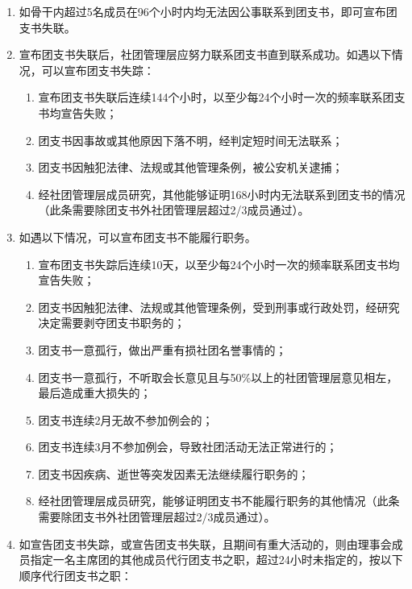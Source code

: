 \begin{enumerate}[resume]
    \item 如骨干内超过5名成员在96个小时内均无法因公事联系到团支书，即可宣布团支书失联。
    
    \item 宣布团支书失联后，社团管理层应努力联系团支书直到联系成功。如遇以下情况，可以宣布团支书失踪：
    
    \begin{enumerate}
        \item 宣布团支书失联后连续144个小时，以至少每24个小时一次的频率联系团支书均宣告失败；
        \item 团支书因事故或其他原因下落不明，经判定短时间无法联系；
        \item 团支书因触犯法律、法规或其他管理条例，被公安机关逮捕；
        \item 经社团管理层成员研究，其他能够证明168小时内无法联系到团支书的情况（此条需要除团支书外社团管理层超过2/3成员通过）。
    \end{enumerate}

    \item 如遇以下情况，可以宣布团支书不能履行职务。
    
    \begin{enumerate}
        \item 宣布团支书失踪后连续10天，以至少每24个小时一次的频率联系团支书均宣告失败；
        \item 团支书因触犯法律、法规或其他管理条例，受到刑事或行政处罚，经研究决定需要剥夺团支书职务的；
        \item 团支书一意孤行，做出严重有损社团名誉事情的；
        \item 团支书一意孤行，不听取会长意见且与50\%以上的社团管理层意见相左，最后造成重大损失的；
        \item 团支书连续2月无故不参加例会的；
        \item 团支书连续3月不参加例会，导致社团活动无法正常进行的；
        \item 团支书因疾病、逝世等突发因素无法继续履行职务的；
        \item 经社团管理层成员研究，能够证明团支书不能履行职务的其他情况（此条需要除团支书外社团管理层超过2/3成员通过）。
    \end{enumerate}
    
    \item 如宣告团支书失踪，或宣告团支书失联，且期间有重大活动的，则由理事会成员指定一名主席团的其他成员代行团支书之职，超过24小时未指定的，按以下顺序代行团支书之职：
    

\end{enumerate}
